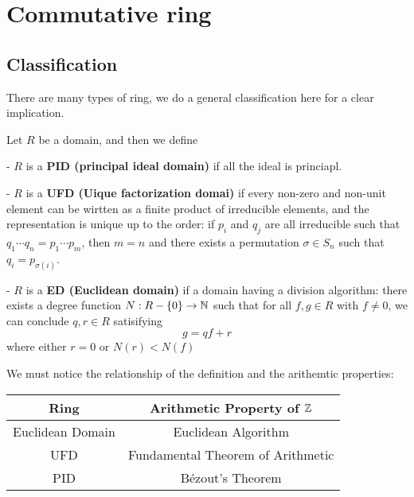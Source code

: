 \section{Commutative ring}

\subsection{Classification}
There are many types of ring, we do a general classification here for a clear implication.

\begin{definition}
    Let \(R\) be a domain, and then we define

    - \(R\) is a \textbf{PID (principal ideal domain)} if all the ideal is princiapl.

    - \(R\) is a \textbf{UFD (Uique factorization domai)} if every non-zero and non-unit element can be wirtten as a finite product of irreducible elements, and the representation is unique up to the order: if \(p_i \) and \(q_j\) are all irreducible such that \(q_1 \cdots q_n = p_1 \cdots p_m\), then \(m=n\) and there exists a permutation \(\sigma \in S_n\) such that \(q_i = p_{\sigma(i)}\).

    - \(R\) is a \textbf{ED (Euclidean domain)} if a domain having a division algorithm: there exists a degree function \(N: R-\{0\} \to \mathbb{N}\) such that for all \(f,g \in R\) with \(f \neq 0\), we can conclude \(q, r \in R\) satisifying 
    \[g = qf +r\]
    where either \(r=0\) or \(N(r)<N(f)\)

    \begin{remark}
        We must notice the relationship of the definition and the arithemtic properties: 

\begin{center}
\begin{tabular}{|c|c|}
\hline
\textbf{Ring} & \textbf{Arithmetic Property of \(\mathbb{Z}\)} \\
\hline
Euclidean Domain & Euclidean Algorithm \\
\hline
UFD & Fundamental Theorem of Arithmetic \\
\hline
PID & Bézout's Theorem \\
\hline
\end{tabular}
\end{center}
   \end{remark}
\end{definition}

